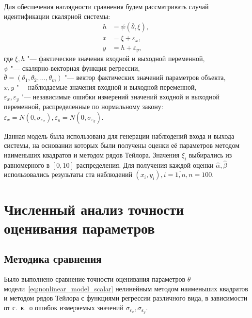 Для обеспечения наглядности сравнения будем рассматривать случай
идентификации скалярной системы:
\begin{equation}
  \label{eq:nonlinear_model_scalar}
  \begin{aligned}
    h &= \psi(\overline{\theta}, \xi), \\
    x &= \xi + \varepsilon_x, \\
    y &= h + \varepsilon_y,
  \end{aligned}
\end{equation}
где \( \xi, h \) "--- фактические значения входной и выходной переменной, \\
\hspace*{7mm} \( \psi \) "--- скалярно-векторная функция регрессии, \\
\hspace*{7mm} \( \overline{\theta} = (\theta_1, \theta_2, \dotsc, \theta_m) \)
"--- вектор фактических значений параметров объекта, \\
\hspace*{7mm} \( x, y \) "--- наблюдаемые значения входной и выходной переменной, \\
\hspace*{6mm} \( \varepsilon_x, \varepsilon_y \)
"--- независимые ошибки измерений значений входной и выходной переменной,
распределенные по нормальному закону:
\(
\varepsilon_x = N(0, \sigma_{\varepsilon_x}),
\varepsilon_y = N(0, \sigma_{\varepsilon_y})
\).

Данная модель была использована для генерации наблюдений входа и выхода системы,
на основании которых были получены оценки её параметров
методом наименьших квадратов и методом рядов Тейлора.
Значения \( \xi_i \) выбирались из равномерного в \( [0, 10] \) распределения.
Для получения каждой оценки \( \hat{\alpha}, \hat{\beta} \) использовались результаты
ста наблюдений \( ( x_i, y_i ), i = \overline{1, n}, n = 100 \).

\vspace{2\baselineskip}
\section{Численный анализ точности оценивания параметров}

\subsection{Методика сравнения}\label{subsec:nonlinear_comparison_conditions}

Было выполнено сравнение точности оценивания параметров \( \overline{\theta} \)
модели~\eqref{eq:nonlinear_model_scalar}
нелинейным методом наименьших квадратов и методом рядов Тейлора
с функциями регрессии различного вида,
в зависимости от с.~к.~о ошибок измеряемых значений
\( \sigma_{\varepsilon_x}, \sigma_{\varepsilon_y} \).


